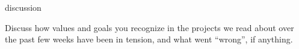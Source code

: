 \documentclass[aspectratio=43,17pt]{beamer} %
\begin{document}
\begin{frame}{discussion}

Discuss how values and goals you recognize in the projects we read about over the past few weeks have been in tension, and what went ``wrong'', if anything.
    

\end{frame}
\end{document}

